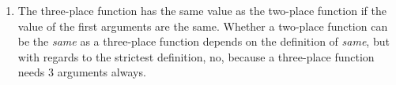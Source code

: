 \documentclass[a4paper,12pt]{article}
\begin{document}
\begin{enumerate}[label=\thesubsection.\arabic*.]

        \item The three-place function has the same value as the two-place function if the value of the first arguments are the same. Whether a two-place function can be the \textit{same} as a three-place function depends on the definition of \textit{same}, but with regards to the strictest definition, no, because a three-place function needs 3 arguments always.


\end{enumerate}
\end{document}
